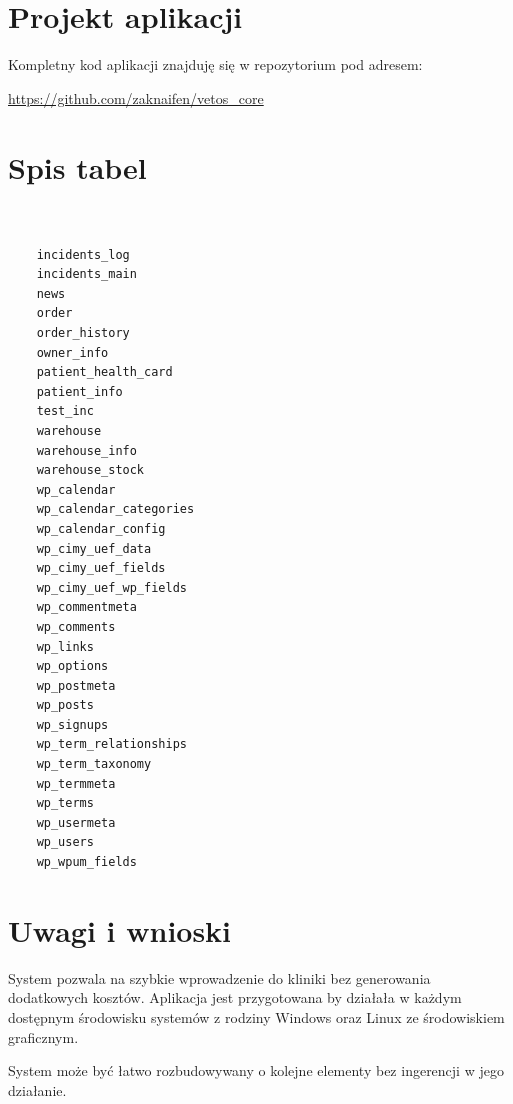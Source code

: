 \documentclass[10pt,a4paper]{article}
\begin{document}
\section{Projekt aplikacji}
Kompletny kod aplikacji znajduję się w repozytorium pod adresem: 

\url{https://github.com/zaknaifen/vetos_core}

\section{Spis tabel}



\begin{lstlisting}


	incidents_log         
	incidents_main         
	news                   
	order                  
	order_history          
	owner_info             
	patient_health_card    
	patient_info           
	test_inc               
	warehouse              
	warehouse_info         
	warehouse_stock        
	wp_calendar            
	wp_calendar_categories 
	wp_calendar_config     
	wp_cimy_uef_data       
	wp_cimy_uef_fields     
	wp_cimy_uef_wp_fields  
	wp_commentmeta         
	wp_comments            
	wp_links               
	wp_options             
	wp_postmeta            
	wp_posts               
	wp_signups             
	wp_term_relationships  
	wp_term_taxonomy       
	wp_termmeta            
	wp_terms               
	wp_usermeta            
	wp_users               
	wp_wpum_fields         
\end{lstlisting}
		
\section{Uwagi i wnioski}
System pozwala na szybkie wprowadzenie do kliniki bez generowania dodatkowych kosztów. Aplikacja jest przygotowana by działała w każdym dostępnym środowisku systemów z rodziny Windows oraz Linux ze środowiskiem graficznym. 

System może być łatwo rozbudowywany o kolejne elementy bez ingerencji w jego działanie. 
		
		
		
\end{document}
